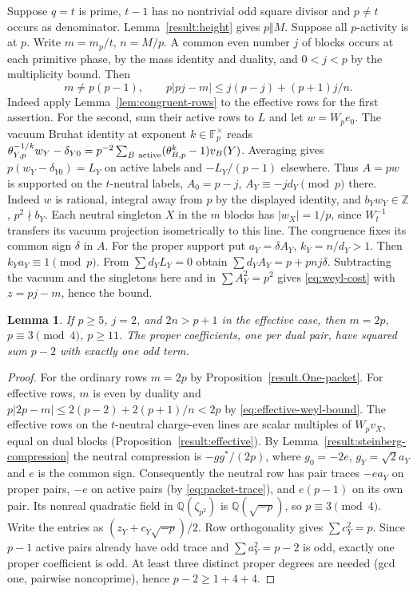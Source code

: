 \documentclass[11pt]{amsart}
\numberwithin{equation}{section}
\newtheorem{lemma}[theorem]{Lemma}
\theoremstyle{definition}
\theoremstyle{plain}
\newcommand{\QQ}{\mathbb Q}
\newcommand{\ZZ}{\mathbb Z}
\begin{document}
Suppose $q=t$ is prime, $t-1$ has no nontrivial odd square divisor and
$p\ne t$ occurs as denominator. Lemma~\ref{result:height} gives $p\Vert M$.
Suppose all $p$-activity is at $p$. Write $m=m_p/t$, $n=M/p$. A common
even number $j$ of blocks occurs at each primitive phase, by the mass
identity and duality, and $0<j<p$ by the multiplicity bound. Then
\begin{equation}\label{eq:effective-weyl-bound}
 m\ne p(p-1),\qquad p|pj-m|\le j(p-j)+(p+1)j/n.
\end{equation}
Indeed apply Lemma~\ref{lem:congruent-rows} to the effective rows for the
first assertion. For the second, sum their active rows to $L$ and let
$w=W_pe_0$. The vacuum Bruhat identity at exponent $k\in\mathbb F_p^\times$ reads
$\theta_{Y,p}^{-1/k}w_Y-\delta_{Y0}
=p^{-2}\sum_{B\ {\rm active}}(\theta_{B,p}^k-1)v_B(Y)$.
Averaging gives $p(w_Y-\delta_{Y0})=L_Y$ on active labels and
$-L_Y/(p-1)$ elsewhere. Thus $A=pw$ is supported on the $t$-neutral
labels, $A_0=p-j$, $A_Y\equiv-jd_Y\pmod p$ there.
Indeed $w$ is rational, integral away from $p$ by the displayed identity,
and $b_Yw_Y\in\ZZ$, $p^2\nmid b_Y$. Each neutral singleton $X$ in the
$m$ blocks has $|w_X|=1/p$, since $W_t^{-1}$ transfers its vacuum
projection isometrically to this line. The congruence fixes its common
sign $\delta$ in $A$. For the proper support put $a_Y=\delta A_Y$,
$k_Y=n/d_Y>1$. Then $k_Ya_Y\equiv1\pmod p$.
From $\sum d_Y L_Y=0$ obtain $\sum d_Y A_Y=p+pnj\delta$.
Subtracting the vacuum and the singletons here and in $\sum A_Y^2=p^2$
gives \eqref{eq:weyl-cost} with $z=pj-m$, hence the bound.

\begin{lemma}\label{odd.Two-neutral}
If $p\ge5$, $j=2$, and $2n>p+1$ in the effective case, then $m=2p$, $p\equiv3\pmod4$, $p\ge11$.
The proper coefficients, one per dual pair, have squared sum $p-2$
with exactly one odd term.
\end{lemma}
\begin{proof}
For the ordinary rows $m=2p$ by Proposition~\ref{result.One-packet}.
For effective rows, $m$ is even by duality and
$p|2p-m|\le2(p-2)+2(p+1)/n<2p$ by \eqref{eq:effective-weyl-bound}.
The effective rows on the $t$-neutral charge-even lines are scalar
multiples of $W_pv_X$, equal on dual blocks (Proposition~\ref{result:effective}).
By Lemma~\ref{result:steinberg-compression} the neutral compression is $-gg^*/(2p)$, where $g_0=-2e$,
$g_Y=\sqrt2a_Y$ and $e$ is the common sign. Consequently the neutral
row has pair traces $-ea_Y$ on proper pairs, $-e$ on active pairs
(by \eqref{eq:packet-trace}), and $e(p-1)$ on its own pair.
Its nonreal quadratic field in $\QQ(\zeta_{p^2})$ is $\QQ(\sqrt{-p})$,
so $p\equiv3\pmod4$. Write the entries as $(z_Y+c_Y\sqrt{-p})/2$.
Row orthogonality gives $\sum c_Y^2=p$. Since $p-1$ active pairs
already have odd trace and $\sum a_Y^2=p-2$ is odd, exactly one
proper coefficient is odd. At least three distinct proper degrees
are needed (gcd one, pairwise noncoprime), hence $p-2\ge1+4+4$.
\end{proof}
\end{document}
